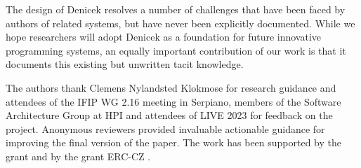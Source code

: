 \documentclass[sigconf]{acmart}
\begin{document}
The design of Denicek resolves a number of challenges that have been faced by authors of related
systems, but have never been explicitly documented. While we hope researchers will adopt
Denicek as a foundation for future innovative programming systems, an equally important
contribution of our work is that it documents this existing but unwritten tacit knowledge.


\begin{acks}
The authors thank Clemens Nylandsted Klokmose for research guidance and
attendees of the IFIP WG 2.16 meeting in Serpiano, members of the Software Architecture Group at HPI
and attendees of LIVE 2023 for feedback on the project.
Anonymous reviewers provided invaluable actionable guidance for improving the final version
of the paper. The work has been supported by the
grant  and by the
grant ERC-CZ .
\end{acks}

%




\appendix
\end{document}
